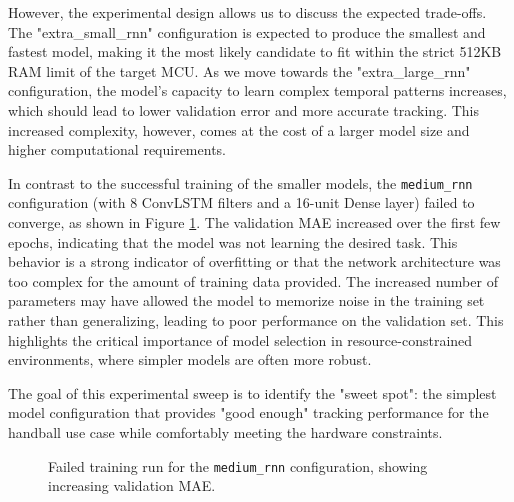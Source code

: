 \documentclass{article}
\begin{document}
However, the experimental design allows us to discuss the expected trade-offs. The "extra\_small\_rnn" configuration is expected to produce the smallest and fastest model, making it the most likely candidate to fit within the strict 512KB RAM limit of the target MCU. As we move towards the "extra\_large\_rnn" configuration, the model's capacity to learn complex temporal patterns increases, which should lead to lower validation error and more accurate tracking. This increased complexity, however, comes at the cost of a larger model size and higher computational requirements.

In contrast to the successful training of the smaller models, the \texttt{medium\_rnn} configuration (with 8 ConvLSTM filters and a 16-unit Dense layer) failed to converge, as shown in Figure \ref{fig:validation_mae_medium_rnn}. The validation MAE increased over the first few epochs, indicating that the model was not learning the desired task. This behavior is a strong indicator of overfitting or that the network architecture was too complex for the amount of training data provided. The increased number of parameters may have allowed the model to memorize noise in the training set rather than generalizing, leading to poor performance on the validation set. This highlights the critical importance of model selection in resource-constrained environments, where simpler models are often more robust.

The goal of this experimental sweep is to identify the "sweet spot": the simplest model configuration that provides "good enough" tracking performance for the handball use case while comfortably meeting the hardware constraints.

\begin{figure}[h!]
\centering
{}
\caption{Failed training run for the \texttt{medium\_rnn} configuration, showing increasing validation MAE.}
\label{fig:validation_mae_medium_rnn}
\end{figure}
\end{document}
